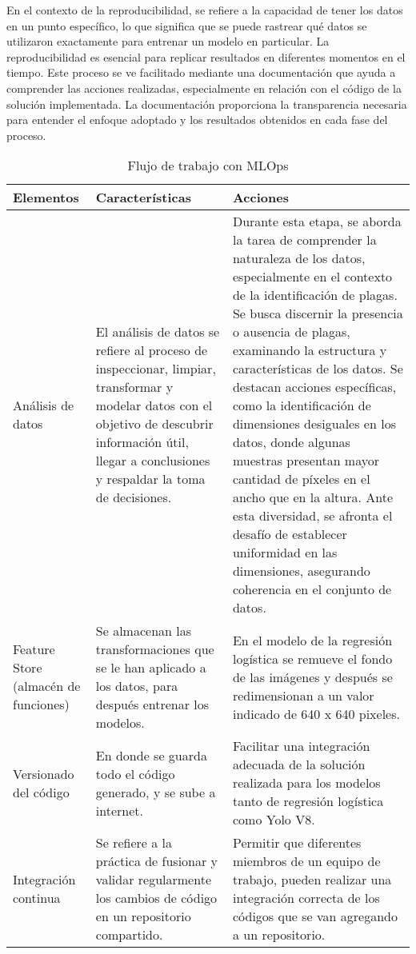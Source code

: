 En el contexto de la reproducibilidad, se refiere a la capacidad de tener los datos en un punto específico, lo que significa que se puede rastrear qué datos se utilizaron exactamente para entrenar un modelo en particular. La reproducibilidad es esencial para replicar resultados en diferentes momentos en el tiempo. Este proceso se ve facilitado mediante una documentación que ayuda a comprender las acciones realizadas, especialmente en relación con el código de la solución implementada. La documentación proporciona la transparencia necesaria para entender el enfoque adoptado y los resultados obtenidos en cada fase del proceso.

\newpage

\begin{longtable}{|p{3cm}|p{5cm}|p{6cm}|}
\caption{Flujo de trabajo con MLOps}\\
    \hline
    \textbf{Elementos} & \textbf{Características} & \textbf{Acciones} \\
    \hline
    \endhead
        Análisis de datos & El análisis de datos se refiere al proceso de inspeccionar, limpiar, transformar y modelar datos con el objetivo de descubrir información útil, llegar a conclusiones y respaldar la toma de decisiones. & Durante esta etapa, se aborda la tarea de comprender la naturaleza de los datos, especialmente en el contexto de la identificación de plagas. Se busca discernir la presencia o ausencia de plagas, examinando la estructura y características de los datos. Se destacan acciones específicas, como la identificación de dimensiones desiguales en los datos, donde algunas muestras presentan mayor cantidad de píxeles en el ancho que en la altura. Ante esta diversidad, se afronta el desafío de establecer uniformidad en las dimensiones, asegurando coherencia en el conjunto de datos. \\
        \hline
        Feature Store (almacén de funciones) & Se almacenan las transformaciones que se le han aplicado a los datos, para después entrenar los modelos. & En el modelo de la regresión logística se remueve el fondo de las imágenes y después se redimensionan a un valor indicado de 640 x 640 pixeles. \\
        \hline
        Versionado del código & En donde se guarda todo el código generado, y se sube a internet. & Facilitar una integración adecuada de la solución realizada para los modelos tanto de regresión logística como Yolo V8. \\
        \hline
        Integración continua & Se refiere a la práctica de fusionar y validar regularmente los cambios de código en un repositorio compartido. & Permitir que diferentes miembros de un equipo de trabajo, pueden realizar una integración correcta de los códigos que se van agregando a un repositorio. \\

\end{longtable}
